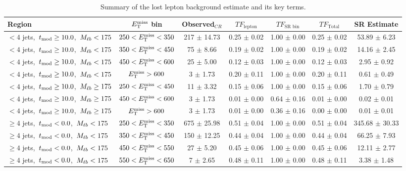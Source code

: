 \begin{table}
\centering
\small
\caption{Summary of the lost lepton background estimate and its key terms.}
\label{tab:stop:lostlep:results}
\begin{tabular}{|l|c|c|c|c|c|c|} \hline
Region & $E_\text{T}^\text{miss}$ bin & Observed$_{CR}$ & $TF_\text{lepton}$ & $TF_\text{SR bin}$ & $TF_\text{Total}$ & SR Estimate \\ \hline \hline
 $<4$ jets,~$t_\text{mod} \ge10.0$,~$M_{\ell b} <175$ & $250<E_\text{T}^\text{miss}<350$  & 217 $\pm$ 14.73  & 0.25 $\pm$ 0.02  & 1.00 $\pm$ 0.00 & 0.25 $\pm$ 0.02  & 53.89 $\pm$ 6.23  \\
 $<4$ jets,~$t_\text{mod} \ge10.0$,~$M_{\ell b} <175$ & $350<E_\text{T}^\text{miss}<450$  & 75 $\pm$ 8.66  & 0.19 $\pm$ 0.02  & 1.00 $\pm$ 0.00 & 0.19 $\pm$ 0.02  & 14.16 $\pm$ 2.45  \\
 $<4$ jets,~$t_\text{mod} \ge10.0$,~$M_{\ell b} <175$ & $450<E_\text{T}^\text{miss}<600$  & 25 $\pm$ 5.00  & 0.12 $\pm$ 0.03  & 1.00 $\pm$ 0.00 & 0.12 $\pm$ 0.03  & 2.95 $\pm$ 0.92  \\
 $<4$ jets,~$t_\text{mod} \ge10.0$,~$M_{\ell b} <175$ & $E_\text{T}^\text{miss}>600$  & 3 $\pm$ 1.73  & 0.20 $\pm$ 0.11  & 1.00 $\pm$ 0.00 & 0.20 $\pm$ 0.11  & 0.61 $\pm$ 0.49  \\
\hline
 $<4$ jets,~$t_\text{mod} \ge10.0$,~$M_{\ell b} \ge175$ & $250<E_\text{T}^\text{miss}<450$  & 11 $\pm$ 3.32  & 0.15 $\pm$ 0.06  & 1.00 $\pm$ 0.00 & 0.15 $\pm$ 0.06  & 1.70 $\pm$ 0.79  \\
 $<4$ jets,~$t_\text{mod} \ge10.0$,~$M_{\ell b} \ge175$ & $450<E_\text{T}^\text{miss}<600$  & 3 $\pm$ 1.73  & 0.01 $\pm$ 0.00  & 0.64 $\pm$ 0.16 & 0.01 $\pm$ 0.00  & 0.02 $\pm$ 0.01  \\
 $<4$ jets,~$t_\text{mod} \ge10.0$,~$M_{\ell b} \ge175$ & $E_\text{T}^\text{miss}>600$  & 3 $\pm$ 1.73  & 0.01 $\pm$ 0.00  & 0.36 $\pm$ 0.16 & 0.00 $\pm$ 0.00  & 0.01 $\pm$ 0.01  \\
\hline
 $\ge4$ jets,~$t_\text{mod} <0.0$,~$M_{\ell b} <175$ & $250<E_\text{T}^\text{miss}<350$  & 675 $\pm$ 25.98  & 0.51 $\pm$ 0.04  & 1.00 $\pm$ 0.00 & 0.51 $\pm$ 0.04  & 345.68 $\pm$ 30.33  \\
 $\ge4$ jets,~$t_\text{mod} <0.0$,~$M_{\ell b} <175$ & $350<E_\text{T}^\text{miss}<450$  & 150 $\pm$ 12.25  & 0.44 $\pm$ 0.04  & 1.00 $\pm$ 0.00 & 0.44 $\pm$ 0.04  & 66.25 $\pm$ 7.93  \\
 $\ge4$ jets,~$t_\text{mod} <0.0$,~$M_{\ell b} <175$ & $450<E_\text{T}^\text{miss}<550$  & 27 $\pm$ 5.20  & 0.45 $\pm$ 0.06  & 1.00 $\pm$ 0.00 & 0.45 $\pm$ 0.06  & 12.11 $\pm$ 2.77  \\
 $\ge4$ jets,~$t_\text{mod} <0.0$,~$M_{\ell b} <175$ & $550<E_\text{T}^\text{miss}<650$  & 7 $\pm$ 2.65  & 0.48 $\pm$ 0.11  & 1.00 $\pm$ 0.00 & 0.48 $\pm$ 0.11  & 3.38 $\pm$ 1.48  \\

\end{tabular}
\end{table}
